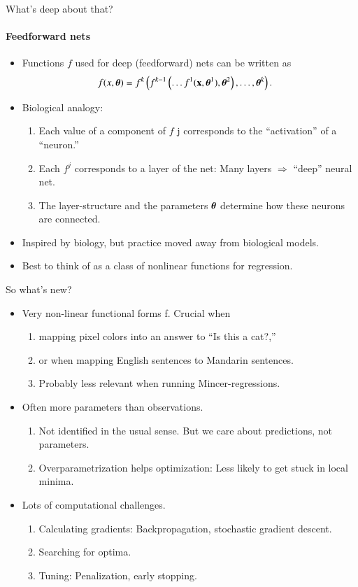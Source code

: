 \documentclass[notes, ignorenonframetext, compress, 10pt, xcolor=svgnames, aspectratio=169]{beamer}
\begin{document}
\begin{frame}[allowframebreaks]{What’s deep about that?}
\framesubtitle{Feedforward nets}
\begin{itemize}
  \item Functions $f$ used for deep (feedforward) nets can be written as
  \begin{align*}
  f(x,{\boldsymbol \theta}) &= f^k\left(f^{k-1}
  \left(\ldots f^1({\mathbf x}, {\boldsymbol \theta}^1), {\boldsymbol \theta}^2\right),\ldots, {\boldsymbol \theta}^k\right).
  \end{align*}
  \item Biological analogy:
  \begin{enumerate}[$\cdot$]
  \item Each value of a component of $f$
  j corresponds to the “activation” of a “neuron.”
  \item Each $f^j$ corresponds to a layer of the net: Many layers $\Rightarrow$ “deep” neural net.
  \item The layer-structure and the parameters ${\boldsymbol \theta}$ determine how these neurons are
  connected.
  \end{enumerate}
  \item Inspired by biology, but practice moved away from biological models.
  \item Best to think of as a class of nonlinear functions for regression.
\end{itemize}
\end{frame}

\begin{frame}[allowframebreaks]{So what’s new?}
\begin{itemize}
\item Very non-linear functional forms f. Crucial when
\begin{enumerate}[$\cdot$]
\item mapping pixel colors into an answer to “Is this a cat?,”
\item or when mapping English sentences to Mandarin sentences.
\item Probably less relevant when running Mincer-regressions.
\end{enumerate}
\item Often more parameters than observations.
\begin{enumerate}[$\cdot$]
  \item Not identified in the usual sense.
But we care about predictions, not parameters.
\item Overparametrization helps optimization:
Less likely to get stuck in local minima.
\end{enumerate}
\item Lots of computational challenges.
\begin{enumerate}
\item Calculating gradients:
Backpropagation, stochastic gradient descent.
\item Searching for optima.
\item Tuning: Penalization, early stopping.
\end{enumerate}
\end{itemize}
\end{frame}
\end{document}
